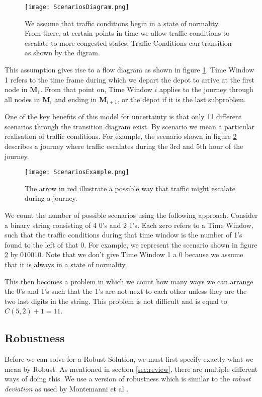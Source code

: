 \begin{figure}[h!]
	\centering
	\texttt{[image: ScenariosDiagram.png]}
	\caption{We assume that traffic conditions begin in a state of normality. From there, at certain points in time we allow traffic conditions to escalate to more congested states. Traffic Conditions can transition as shown by the digram.}
	\label{fig:scen_diag}
\end{figure}

This assumption gives rise to a flow diagram as shown in figure \ref{fig:scen_diag}. Time Window 1 refers to the time frame during which we depart the depot to arrive at the first node in $\mathbf{M}_1$. From that point on, Time Window $i$ applies to the journey through all nodes in $\mathbf{M}_{i}$ and ending in $\mathbf{M}_{i+1}$, or the depot if it is the last subproblem. 

One of the key benefits of this model for uncertainty is that only 11 different scenarios through the transition diagram exist. By scenario we mean a particular realisation of traffic conditions. For example, the scenario shown in figure \ref{fig:scen_ex} describes a journey where traffic escalates during the 3rd and 5th hour of the journey.

\begin{figure}[h!]
	\centering
	\texttt{[image: ScenariosExample.png]}
	\caption{The arrow in red illustrate a possible way that traffic might escalate during a journey.}
	\label{fig:scen_ex}
\end{figure}

We count the number of possible scenarios using the following approach. Consider a binary string consisting of 4 0's and 2 1's. Each zero refers to a Time Window, such that the traffic conditions during that time window is the number of 1's found to the left of that 0. For example, we represent the scenario shown in figure \ref{fig:scen_ex} by $010010$. Note that we don't give Time Window 1 a 0 because we assume that it is always in a state of normality. 

This then becomes a problem in which we count how many ways we can arrange the 0's and 1's such that the 1's are not next to each other unless they are the two last digits in the string. This problem is not difficult and is equal to $C(5,2)+1 = 11$.
\subsection{Robustness}
Before we can solve for a Robust Solution, we must first specify exactly what we mean by Robust. As mentioned in section \ref{sec:review}, there are multiple different ways of doing this. We use a version of robustness which is similar to the \textit{robust deviation} as used by Montemanni et al \cite{montemanni2007robust}.

